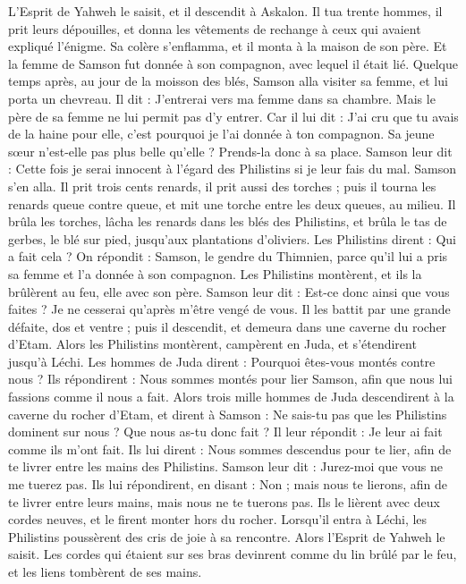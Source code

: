 \begin{multicols}{2}
L'Esprit de Yahweh le saisit, et il descendit à Askalon. Il tua trente hommes, il prit leurs dépouilles, et donna les vêtements de rechange à ceux qui avaient expliqué l'énigme. Sa colère s'enflamma, et il monta à la maison de son père.
Et la femme de Samson fut donnée à son compagnon, avec lequel il était lié.
\VerseOne{}Quelque temps après, au jour de la moisson des blés, Samson alla visiter sa femme, et lui porta un chevreau. Il dit : J'entrerai vers ma femme dans sa chambre. Mais le père de sa femme ne lui permit pas d'y entrer.
Car il lui dit : J'ai cru que tu avais de la haine pour elle, c'est pourquoi je l'ai donnée à ton compagnon. Sa jeune sœur n'est-elle pas plus belle qu'elle ? Prends-la donc à sa place.
Samson leur dit : Cette fois je serai innocent à l'égard des Philistins si je leur fais du mal.
Samson s'en alla. Il prit trois cents renards, il prit aussi des torches ; puis il tourna les renards queue contre queue, et mit une torche entre les deux queues, au milieu.
Il brûla les torches, lâcha les renards dans les blés des Philistins, et brûla le tas de gerbes, le blé sur pied, jusqu'aux plantations d'oliviers.
Les Philistins dirent : Qui a fait cela ? On répondit : Samson, le gendre du Thimnien, parce qu'il lui a pris sa femme et l'a donnée à son compagnon. Les Philistins montèrent, et ils la brûlèrent au feu, elle avec son père.
Samson leur dit : Est-ce donc ainsi que vous faites ? Je ne cesserai qu'après m'être vengé de vous.
Il les battit par une grande défaite, dos et ventre ; puis il descendit, et demeura dans une caverne du rocher d'Etam.
Alors les Philistins montèrent, campèrent en Juda, et s'étendirent jusqu'à Léchi.
Les hommes de Juda dirent : Pourquoi êtes-vous montés contre nous ? Ils répondirent : Nous sommes montés pour lier Samson, afin que nous lui fassions comme il nous a fait.
Alors trois mille hommes de Juda descendirent à la caverne du rocher d'Etam, et dirent à Samson : Ne sais-tu pas que les Philistins dominent sur nous ? Que nous as-tu donc fait ? Il leur répondit : Je leur ai fait comme ils m'ont fait.
Ils lui dirent : Nous sommes descendus pour te lier, afin de te livrer entre les mains des Philistins. Samson leur dit : Jurez-moi que vous ne me tuerez pas.
Ils lui répondirent, en disant : Non ; mais nous te lierons, afin de te livrer entre leurs mains, mais nous ne te tuerons pas. Ils le lièrent avec deux cordes neuves, et le firent monter hors du rocher.
Lorsqu'il entra à Léchi, les Philistins poussèrent des cris de joie à sa rencontre. Alors l'Esprit de Yahweh le saisit. Les cordes qui étaient sur ses bras devinrent comme du lin brûlé par le feu, et les liens tombèrent de ses mains.

\end{multicols}
